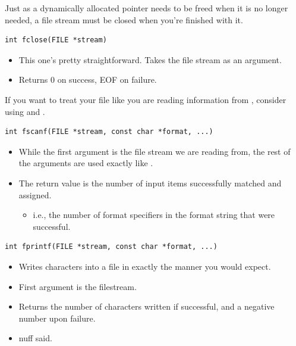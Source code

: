\documentclass[11pt]{beamer}
\let\OldTexttt\texttt
\renewcommand{\texttt}[1]{\OldTexttt{\color{teal}{#1}}}
\begin{document}
\begin{frame}[fragile=singleslide]{\texttt{fclose()}}
Just as a dynamically allocated pointer needs to be freed when it is no longer needed, a file stream must be closed when you're finished with it. 
\begin{lstlisting}[style=C]
int fclose(FILE *stream)
\end{lstlisting}
\begin{itemize}
\item This one's pretty straightforward.  Takes the file stream as an argument.
\item Returns 0 on success, EOF on failure.  
\end{itemize}
\end{frame}

\begin{frame}[fragile=singleslide]{\texttt{fscanf()}}
If you want to treat your file like you are reading information from \texttt{stdin}, consider using \texttt{fscanf()} and \texttt{fprintf()}.
\begin{lstlisting}[style=C]
int fscanf(FILE *stream, const char *format, ...)
\end{lstlisting}
\begin{itemize}
\item While the first argument is the file stream we are reading from, the rest of the arguments are used exactly like \texttt{scanf()}.
\item The return value is the number of input items successfully matched and assigned. 
\begin{itemize}
\item i.e., the number of format specifiers in the format string that were successful.  
\end{itemize}
\end{itemize}
\end{frame}

\begin{frame}[fragile=singleslide]{\texttt{fprintf()}}
\begin{lstlisting}[style=C]
int fprintf(FILE *stream, const char *format, ...)
\end{lstlisting}
\begin{itemize}
\item Writes characters into a file in exactly the manner you would expect.
\item First argument is the filestream.
\item Returns the number of characters written if successful, and a negative number upon failure.
\item nuff said.
\end{itemize}
\end{frame}
\end{document}

